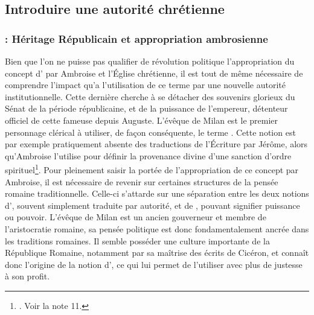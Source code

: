\subsection{Introduire une autorité chrétienne}

\subsubsection{: Héritage Républicain et appropriation ambrosienne}

Bien que l’on ne puisse pas qualifier de révolution politique l’appropriation du concept d’ par Ambroise et l’Église chrétienne, il est tout de même nécessaire de comprendre l’impact qu’a l’utilisation de ce terme par une nouvelle autorité institutionnelle. Cette dernière cherche à se détacher des souvenirs glorieux du Sénat de la période républicaine, et de la puissance de l’empereur, détenteur officiel de cette fameuse  depuis Auguste. L’évêque de Milan est le premier personnage clérical à utiliser, de façon conséquente, le terme . Cette notion est par exemple pratiquement absente des traductions de l’Écriture par Jérôme, alors qu’Ambroise l’utilise pour définir la provenance divine d’une sanction d’ordre spirituel\footnote{\cite[214]{sassier_auctoritas}. Voir la note 11.}. Pour pleinement saisir la portée de l’appropriation de ce concept par Ambroise, il est nécessaire de revenir sur certaines structures de la pensée romaine traditionnelle. Celle-ci s'attarde sur une séparation entre les deux notions d’, souvent simplement traduite par autorité, et de , pouvant signifier puissance ou pouvoir. L’évêque de Milan est un ancien gouverneur et membre de l’aristocratie romaine, sa pensée politique est donc fondamentalement ancrée dans les traditions romaines. Il semble posséder une culture importante de la République Romaine, notamment par sa maîtrise des écrits de Cicéron, et connaît donc l’origine de la notion d’, ce qui lui permet de l’utiliser avec plus de justesse à son profit.

\bigskip

